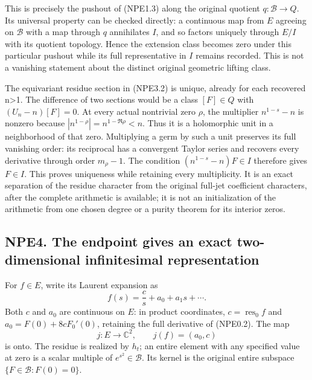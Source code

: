 This is precisely the pushout of (NPE1.3) along the original quotient
\(q:\mathcal B\to Q\). Its universal property can be checked directly: a
continuous map from \(E\) agreeing on \(\mathcal B\) with a map through
\(q\) annihilates \(I\), and so factors uniquely through \(E/I\) with
its quotient topology. Hence the extension class becomes zero under this
particular pushout while its full representative in \(I\) remains
recorded. This is not a vanishing statement about the distinct original
geometric lifting class.

The equivariant residue section in (NPE3.2) is unique, already for each
recovered n\textgreater1. The difference of two sections would be a
class \([F]\in Q\) with \((U_n-n)[F]=0\). At every actual nontrivial
zero \(\rho\), the multiplier \(n^{1-s}-n\) is nonzero because
\(|n^{1-\rho}|=n^{1-\Re\rho}<n\). Thus it is a holomorphic unit in a
neighborhood of that zero. Multiplying a germ by such a unit preserves
its full vanishing order: its reciprocal has a convergent Taylor series
and recovers every derivative through order \(m_\rho-1\). The condition
\((n^{1-s}-n)F\in I\) therefore gives \(F\in I\). This proves uniqueness
while retaining every multiplicity. It is an exact separation of the
residue character from the original full-jet coefficient characters,
after the complete arithmetic is available; it is not an initialization
of the arithmetic from one chosen degree or a purity theorem for its
interior zeros.

\subsection{NPE4. The endpoint gives an exact two-dimensional
infinitesimal
representation}\label{npe4.-the-endpoint-gives-an-exact-two-dimensional-infinitesimal-representation}

For \(f\in E\), write its Laurent expansion as \[
f(s)=\frac c s+a_0+a_1s+\cdots.
\] Both \(c\) and \(a_0\) are continuous on \(E\): in product
coordinates, \(c=\operatorname{res}_0f\) and \(a_0=F(0)+8cF_0'(0)\),
retaining the full derivative of (NPE0.2). The map \[
j:E\longrightarrow\mathbb C^2,\qquad j(f)=(a_0,c)
\tag{NPE4.1}
\] is onto. The residue is realized by \(h_t\); an entire element with
any specified value at zero is a scalar multiple of
\(e^{s^2}\in\mathcal B\). Its kernel is the original entire subspace
\(\{F\in\mathcal B:F(0)=0\}\).

